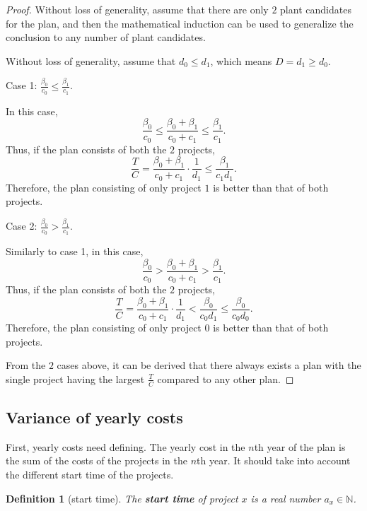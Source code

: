 \documentclass{article}
\newtheorem{definition}{Definition}
\begin{document}
\begin{proof}
Without loss of generality, assume that there are only $2$ plant candidates for the plan,
and then the mathematical induction can be used to generalize the conclusion to any number of plant candidates.

Without loss of generality, assume that $d_0\le d_1$, which means $D=d_1\ge d_0$.

Case 1: $\frac{\beta_0}{c_0}\le\frac{\beta_1}{c_1}$.

In this case,
\begin{equation*}
\frac{\beta_0}{c_0}\le\frac{\beta_0+\beta_1}{c_0+c_1}\le\frac{\beta_1}{c_1}.
\end{equation*}
Thus, if the plan consists of both the $2$ projects,
\begin{equation*}
\frac TC=\frac{\beta_0+\beta_1}{c_0+c_1}\cdot\frac1{d_1}\le\frac{\beta_1}{c_1d_1}.
\end{equation*}
Therefore, the plan consisting of only project $1$ is better than that of both projects.

Case 2: $\frac{\beta_0}{c_0}>\frac{\beta_1}{c_1}$.

Similarly to case 1, in this case,
\begin{equation*}
\frac{\beta_0}{c_0}>\frac{\beta_0+\beta_1}{c_0+c_1}>\frac{\beta_1}{c_1}.
\end{equation*}
Thus, if the plan consists of both the $2$ projects,
\begin{equation*}
\frac TC=\frac{\beta_0+\beta_1}{c_0+c_1}\cdot\frac1{d_1}<\frac{\beta_0}{c_0d_1}\le\frac{\beta_0}{c_0d_0}.
\end{equation*}
Therefore, the plan consisting of only project $0$ is better than that of both projects.

From the $2$ cases above, it can be derived that there always exists a plan with the single project having the largest $\frac TC$ compared to any other plan.
\end{proof}

\subsection{Variance of yearly costs}
\label{sec:variance of yearly costs}

First, yearly costs need defining.
The yearly cost in the $n$th year of the plan is the sum of the costs of the projects in the $n$th year.
It should take into account the different start time of the projects.

\begin{definition}[start time]
The \textbf{start time} of project $x$ is a real number $a_x\in\mathbb N$.
\end{definition}
\end{document}
